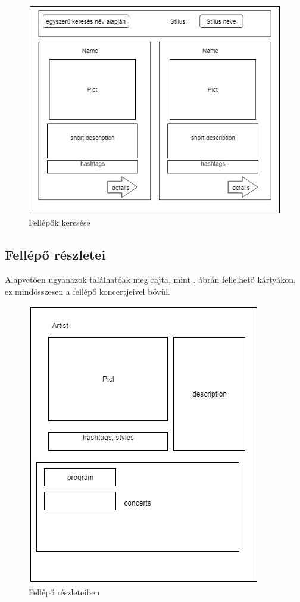 \begin{figure}
\centering
\includegraphics[scale=0.5]{kepek/artist_search.jpg}
\caption{Fellépők keresése}
\label{fig:artist_search}
\end{figure}

\subsection{Fellépő részletei}

Alapvetően ugyanazok találhatóak meg rajta, mint . ábrán fellelhető kártyákon, ez mindösszesen a fellépő koncertjeivel bővül.

\begin{figure}
\centering
\includegraphics[scale=0.5]{kepek/artist_details.jpg}
\caption{Fellépő részleteiben}
\label{fig:artist_details}
\end{figure}

